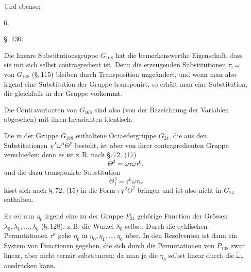 
Und ebenso:

6. 

\begin{center}
\S. 130.

\end{center}

Die lineare Substitutionsgruppe $G_{168}$ hat die bemerkenswerthe Eigenschaft, dass sie mit sich selbst contragredient ist. Denn die erzeugenden Substitutionen $\tau$, $\omega$ von $G_{168}$ (\S.\,115) bleiben durch Transposition ungeändert, und wenn man also irgend eine Substitution der Gruppe transponirt, so erhält man eine Substitution, die gleichfalls in der Gruppe vorkommt.

Die Contravarianten von $G_{168}$ sind also (von der Bezeichnung der Variablen abgesehen) mit ihren Invarianten identisch.

Die in der Gruppe $G_{168}$ enthaltene Octaëdergruppe $G_{24}$, die aus den Substitutionen $\chi^\lambda\omega^\mu\Theta^\nu$ besteht, ist aber von ihrer contragredienten Gruppe verschieden; denn es ist z.\,B. nach \S.\,72, (17)
\[
\Theta^3 = \omega\tau\omega\tau^6,
\]
und die dazu transponirte Substitution
\[
\Theta_1^3 = \tau^6\omega\tau\omega
\]
lässt sich nach \S.\,72, (15) in die Form $\tau\chi^2\Theta^2$ bringen und ist also nicht in $G_{24}$ enthalten.

Es sei nun $\eta_0$ irgend eine zu der Gruppe $P_{24}$ gehörige Function der Grössen $\lambda_0, \lambda_1, \ldots, \lambda_6$ (\S.\,128), z.\,B. die Wurzel $\lambda_0$ selbst. Durch die cyklischen Permutationen $\tau^\nu$ gehe $\eta_0$ in $\eta_0, \eta_1, \ldots, \eta_6$ über. In den Resolventen
ist dann ein System von Functionen gegeben, die sich durch die Permutationen von $P_{168}$ zwar linear, aber nicht ternär substituiren; da man ja die $\eta_\nu$ selbst linear durch die $\tilde\omega_r$ ausdrücken kann.
